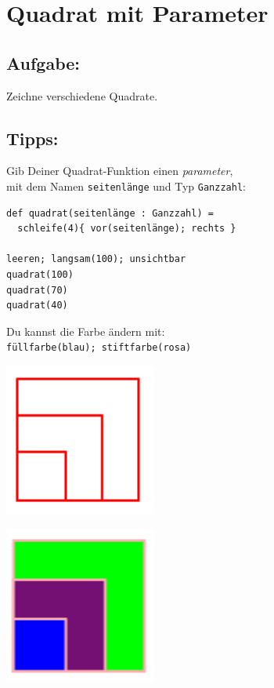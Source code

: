 \chapter{Quadrat mit Parameter}
\begin{multicols}{2}
\section*{\color{BrickRed}Aufgabe:}
Zeichne verschiedene Quadrate.
\section*{\color{OliveGreen}Tipps:}
Gib Deiner Quadrat-Funktion einen {\it parameter},\\
mit dem Namen \lstinline{seitenlänge} und Typ \lstinline{Ganzzahl}:

\begin{lstlisting}[basicstyle={\ttfamily\fontsize{16}{19}\selectfont},numbers=none]
def quadrat(seitenlänge : Ganzzahl) = 
  schleife(4){ vor(seitenlänge); rechts }

leeren; langsam(100); unsichtbar
quadrat(100) 
quadrat(70)
quadrat(40)
\end{lstlisting}
        
Du kannst die Farbe ändern mit:\\
\lstinline{füllfarbe(blau); stiftfarbe(rosa)}


\columnbreak


\begin{center}
\includegraphics[width=5.0cm]{../img/square-param.png}
\end{center}

\begin{center}
\includegraphics[width=5.0cm]{../img/square-param-color.png}
\end{center}

\end{multicols}

